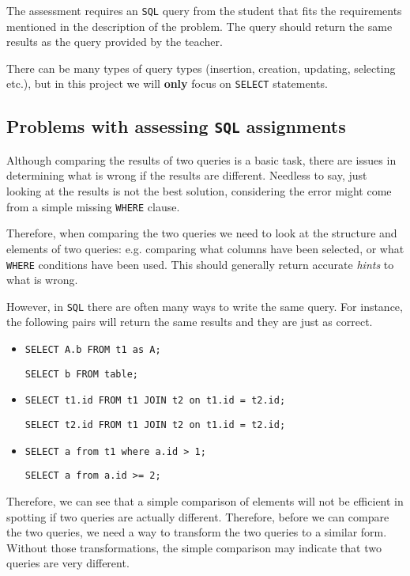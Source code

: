 The assessment requires an \texttt{SQL} query from the student that fits the requirements
mentioned in the description of the problem. The query should return the same
results as the query provided by the teacher.

There can be many types of query types (insertion, creation, updating, selecting
etc.), but in this project we will \textbf{only}
focus on \texttt{SELECT} statements.

\subsection{Problems with assessing \texttt{SQL} assignments}
Although comparing the results of two queries is a basic task, there are issues
in determining what is wrong if the results are different. Needless to say, just
looking at the results is not the best solution, considering the error might come
from a simple missing \texttt{WHERE} clause.

Therefore, when comparing the two queries we need to look at the structure
and elements of two queries: e.g. comparing what columns have been selected, or
what \texttt{WHERE} conditions have been used. This should generally return accurate
\textit{hints} to what is wrong.

However, in \texttt{SQL} there are often many ways to write the same query.
For instance, the following pairs will return the same results and they are
just as correct.

\begin{itemize}
  \item \texttt{SELECT A.b FROM t1 as A;}

  \texttt{SELECT b FROM table;}
  \item \texttt{SELECT t1.id FROM t1 JOIN t2 on t1.id = t2.id;}

  \texttt{SELECT t2.id FROM t1 JOIN t2 on t1.id = t2.id;}
  \item \texttt{SELECT a from t1 where a.id > 1;}

  \texttt{SELECT a from a.id >= 2;}
\end{itemize}

Therefore, we can see that a simple comparison of elements will not be efficient
in spotting if two queries are actually different. Therefore, before we can
compare the two queries, we need a way to transform the two queries to a
similar form. Without those transformations, the simple comparison may indicate
that two queries are very different.

